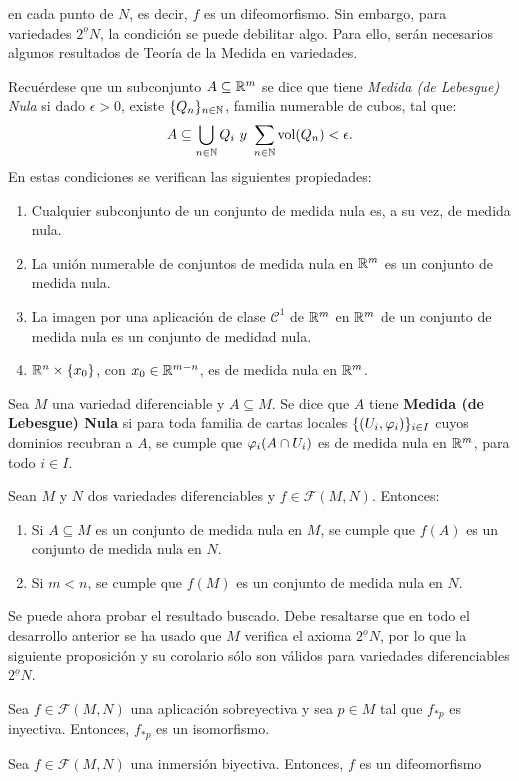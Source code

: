 \documentclass[cursovd_portada.tex]{subfiles}
\begin{document}
en cada punto de $N$, es decir, $f$ es un difeomorfismo. Sin
embargo, para variedades $2^{\underline{o}}N$, la condición se
puede debilitar algo. Para ello, serán necesarios algunos
resultados de Teoría de la Medida en variedades.
\par
Recuérdese que un subconjunto $A\subseteq\mathbb{R}^m$ se dice que
tiene {\it Medida (de Lebesgue) Nula} si dado $\epsilon>0$, existe
$\{Q_n\}_{n\in\mathbb{N}}$, familia numerable de cubos, tal que:
$$A\subseteq\bigcup_{n\in\mathbb{N}}Q_i\mbox{ }y\mbox{ }\sum_{n\in\mathbb{N}}{\rm vol}(Q_n)<\epsilon.$$
\hs En estas condiciones se verifican las siguientes propiedades:
\begin{enumerate}
\item Cualquier subconjunto de un conjunto de medida nula es, a su
vez, de medida nula. \item La unión numerable de conjuntos de
medida nula en $\mathbb{R}^m$ es un conjunto de medida nula. \item La
imagen por una aplicación de clase $\mathcal{C}^1$ de $\mathbb{R}^m$
en $\mathbb{R}^m$ de un conjunto de medida nula es un conjunto de medidad
nula. \item $\mathbb{R}^n\times\{x_0\}$, con $x_0\in\mathbb{R}^{m-n}$, es de
medida nula en $\mathbb{R}^m$.
\end{enumerate}
\begin{defi}
Sea $M$ una variedad diferenciable y $A\subseteq M$. Se dice que
$A$ tiene {\bf Medida (de Lebesgue) Nula} si para toda familia de
cartas locales $\{(U_i,\varphi_i)\}_{i\in I}$ cuyos dominios recubran
a $A$, se cumple que $\varphi_i(A\cap U_i)$ es de medida nula en
$\mathbb{R}^m$, para todo $i\in I$.
\end{defi}
\begin{prop}
Sean $M$ y $N$ dos variedades diferenciables y
$f\in\mathcal{F}(M,N)$. Entonces:
\begin{enumerate}
\item Si $A\subseteq M$ es un conjunto de medida nula en $M$, se
cumple que $f(A)$ es un conjunto de medida nula en $N$. \item Si
$m<n$, se cumple que $f(M)$ es un conjunto de medida nula en $N$.
\end{enumerate}
\end{prop}
\hs Se puede ahora probar el resultado buscado. Debe resaltarse
que en todo el desarrollo anterior se ha usado que $M$ verifica el
axioma $2^{\underline{o}}N$, por lo que la si\-guien\-te
proposición y su corolario sólo son válidos para
variedades diferenciables $2^{\underline{o}}N$.
\begin{prop}
Sea $f\in\mathcal{F}(M,N)$ una aplicación sobreyectiva y sea
$p\in M$ tal que $f_{*p}$ es inyectiva. Entonces, $f_{*p}$ es un
isomorfismo.
\end{prop}
\begin{coro}
Sea $f\in\mathcal{F}(M,N)$ una inmersión biyectiva. Entonces,
$f$ es un difeomorfismo
\end{coro}
\end{document}
